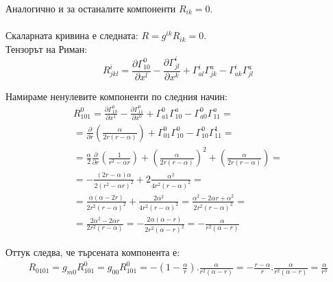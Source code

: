\documentclass[a4paper,12pt]{article}
\begin{document}
    Аналогично и за останалите компоненти $R_{ik}=0$.\\ \\
    Скаларната кривина е следната: $R=g^{ik}R_{ik}=0$.\\

    Тензорът на Риман: 
    \begin{equation*}
        R^i_{jkl}=\frac{\partial\varGamma^0_{10}}{\partial x^l} - \frac{\partial \varGamma^i_{jl}}{\partial x^k} + \varGamma^i_{al}\varGamma^a_{jk}-\varGamma^i_{ak}\varGamma^a_{jl}
    \end{equation*}

    Намираме ненулевите компоненти по следния начин: 
    \begin{equation*}
        \begin{aligned}
            R^0_{101} = \frac{\partial \varGamma^0_{10}}{\partial x^1} - \frac{\partial\varGamma^0_{11}}{\partial x^0}+ \varGamma^0_{a1}\varGamma^a_{10}
            - \varGamma^0_{a0}\varGamma^a_{11}= \\
            = \frac{\partial}{\partial r} \left( \frac{\alpha}{2r(r-\alpha)} \right)
            + \varGamma^0_{01}\varGamma^0_{10} - \varGamma^0_{10}\varGamma^1_{11} =\\
            = \frac{\alpha}{2}\frac{\partial}{\partial r}\left( \frac{1}{r^2-\alpha r} \right) + \left( \frac{\alpha}{2r(r-\alpha)} \right)^2 + \left( \frac{\alpha}{2r(r-\alpha)} \right)= \\
            = - \frac{(2r-\alpha)\alpha}{2(r^2-\alpha r)^2} + 2\frac{\alpha^2}{4r^2(r-\alpha)^2} = \\
            = \frac{\alpha(\alpha - 2r)}{2r^2(r-\alpha)^2} + \frac{2\alpha^2}{4r^2(r-\alpha)^2} = \frac{\alpha^2-2\alpha r + \alpha^2}{2r^2(r-\alpha)^2}= \\
            = \frac{2\alpha^2-2\alpha r}{2r^2(r-\alpha)} = -\frac{2\alpha(\alpha-r)}{2r^2(\alpha-r)^2} = - \frac{\alpha}{r^2(\alpha - r)}
        \end{aligned}
    \end{equation*}

    Оттук следва, че търсената компонента е:
    \begin{equation*}
        \begin{aligned}
            R_{0101} = g_{m0}R^0_{101} = g_{00}R^0_{101} = -\left( 1-\frac{\alpha}{r}\right).\frac{\alpha}{r^2(\alpha -r)} = - \frac{r-\alpha}{r}.\frac{\alpha}{r^2(\alpha-r)} = \frac{\alpha}{r^3}
        \end{aligned}
    \end{equation*}
\end{document}
